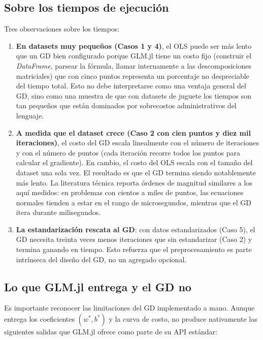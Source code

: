 \documentclass[11pt,a4paper]{article}
\begin{document}
\subsection{Sobre los tiempos de ejecución}

Tres observaciones sobre los tiempos:

\begin{enumerate}
    \item \textbf{En datasets muy pequeños (Casos 1 y 4)}, el OLS puede ser más lento que un GD bien configurado porque GLM.jl tiene un costo fijo (construir el \textit{DataFrame}, parsear la fórmula, llamar internamente a las descomposiciones matriciales) que con cinco puntos representa un porcentaje no despreciable del tiempo total. Esto no debe interpretarse como una ventaja general del GD, sino como una muestra de que con datasets de juguete los tiempos son tan pequeños que están dominados por sobrecostos administrativos del lenguaje.
    \item \textbf{A medida que el dataset crece (Caso 2 con cien puntos y diez mil iteraciones)}, el costo del GD escala linealmente con el número de iteraciones y con el número de puntos (cada iteración recorre todos los puntos para calcular el gradiente). En cambio, el costo del OLS escala con el tamaño del dataset una sola vez. El resultado es que el GD termina siendo notablemente más lento. La literatura técnica reporta órdenes de magnitud similares a los aquí medidos: en problemas con cientos a miles de puntos, las ecuaciones normales tienden a estar en el rango de microsegundos, mientras que el GD itera durante milisegundos.
    \item \textbf{La estandarización rescata al GD}: con datos estandarizados (Caso 5), el GD necesita treinta veces menos iteraciones que sin estandarizar (Caso 2) y termina ganando en tiempo. Esto refuerza que el preprocesamiento es parte intrínseca del diseño del GD, no un agregado opcional.
\end{enumerate}

\subsection{Lo que GLM.jl entrega y el GD no}

Es importante reconocer las limitaciones del GD implementado a mano. Aunque entrega los coeficientes $(w^*, b^*)$ y la curva de costo, no produce nativamente las siguientes salidas que GLM.jl ofrece como parte de su API estándar:
\end{document}
